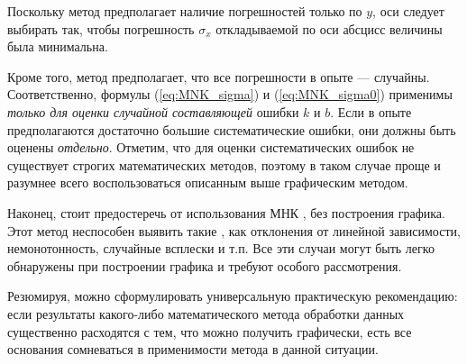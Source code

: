 Поскольку метод предполагает наличие погрешностей только по $y$,
оси следует выбирать так, чтобы погрешность $\sigma_{x}$ откладываемой
по оси абсцисс величины была минимальна.

Кроме того, метод предполагает, что все погрешности в опыте ---
случайны. Соответственно, формулы (\ref{eq:MNK_sigma}) и (\ref{eq:MNK_sigma0})
применимы \emph{только для оценки случайной составляющей} ошибки $k$
и $b$. Если в опыте предполагаются достаточно большие систематические
ошибки, они должны быть оценены \emph{отдельно}. Отметим, что для
оценки систематических ошибок не существует строгих математических
методов, поэтому в таком случае проще и разумнее всего воспользоваться
описанным выше графическим методом.

Наконец, стоит предостеречь от использования МНК ,
без построения графика. Этот метод неспособен выявить такие ,
как отклонения от линейной зависимости, немонотонность, случайные
всплески и т.п. Все эти случаи могут быть легко обнаружены при построении
графика и требуют особого рассмотрения.

Резюмируя, можно сформулировать универсальную практическую рекомендацию:
если результаты какого-либо математического метода обработки данных
существенно расходятся с тем, что можно получить 
графически, есть все основания сомневаться в применимости метода в
данной ситуации.

